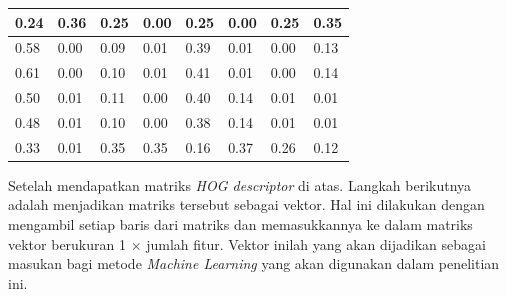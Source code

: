 \begin{enumerate}
\begin{table}[H]
	\centering
	\begin{small}
		\begin{tabular}{|p{1cm}|p{1cm}|p{1cm}|p{1cm}|p{1cm}|p{1cm}|p{1cm}|p{1cm}|}
			\hline
			0.24 & 0.36 & 0.25 & 0.00 & 0.25 & 0.00 & 0.25 & 0.35 \\ \hline
			0.58 & 0.00 & 0.09 & 0.01 & 0.39 & 0.01 & 0.00 & 0.13 \\ \hline
			0.61 & 0.00 & 0.10 & 0.01 & 0.41 & 0.01 & 0.00 & 0.14 \\ \hline
			0.50 & 0.01 & 0.11 & 0.00 & 0.40 & 0.14 & 0.01 & 0.01 \\ \hline
			0.48 & 0.01 & 0.10 & 0.00 & 0.38 & 0.14 & 0.01 & 0.01 \\ \hline
			0.33 & 0.01 & 0.35 & 0.35 & 0.16 & 0.37 & 0.26 & 0.12 \\ \hline
		\end{tabular}
	\end{small}
	\label{fig:MatriksHasilNormalisasi}
\end{table}
Setelah mendapatkan matriks \textit{HOG descriptor} di atas. Langkah berikutnya adalah menjadikan matriks tersebut sebagai vektor. Hal ini dilakukan dengan mengambil setiap baris dari matriks dan memasukkannya ke dalam matriks vektor berukuran 1 $\times$ jumlah fitur. Vektor inilah yang akan dijadikan sebagai masukan bagi metode \textit{Machine Learning} yang akan digunakan dalam penelitian ini.\\
\end{enumerate}

